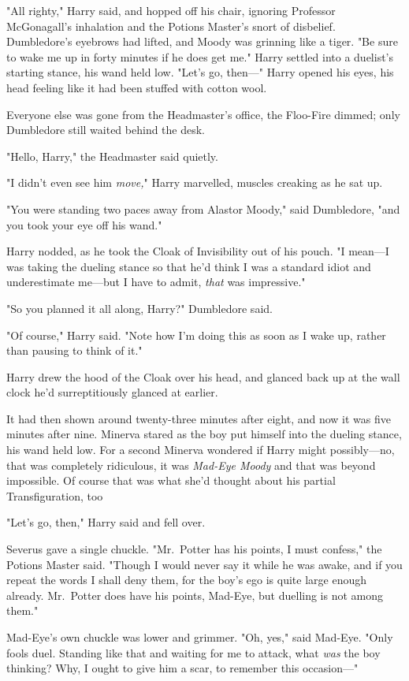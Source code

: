 "All righty," Harry said, and hopped off his chair, ignoring Professor
McGonagall's inhalation and the Potions Master's snort of disbelief.
Dumbledore's eyebrows had lifted, and Moody was grinning like a tiger. "Be sure
to wake me up in forty minutes if he does get me." Harry settled into a
duelist's starting stance, his wand held low. "Let's go, then—"
\sbreak
Harry opened his eyes, his head feeling like it had been stuffed with cotton
wool.

Everyone else was gone from the Headmaster's office, the Floo-Fire dimmed; only
Dumbledore still waited behind the desk.

"Hello, Harry," the Headmaster said quietly.

"I didn't even see him \emph{move,}" Harry marvelled, muscles creaking as he
sat up.

"You were standing two paces away from Alastor Moody," said Dumbledore, "and
you took your eye off his wand."

Harry nodded, as he took the Cloak of Invisibility out of his pouch. "I
mean—I was taking the dueling stance so that he'd think I was a standard
idiot and underestimate me—but I have to admit, \emph{that} was impressive."

"So you planned it all along, Harry?" Dumbledore said.

"Of course," Harry said. "Note how I'm doing this as soon as I wake up, rather
than pausing to think of it."

Harry drew the hood of the Cloak over his head, and glanced back up at the wall
clock he'd surreptitiously glanced at earlier.

It had then shown around twenty-three minutes after eight, and now it was five
minutes after nine.
\sbreak
Minerva stared as the boy put himself into the dueling stance, his wand held
low. For a second Minerva wondered if Harry might possibly—no, that was
completely ridiculous, it was \emph{Mad-Eye Moody} and that was beyond
impossible. Of course that was what she'd thought about his partial
Transfiguration, too{\el}

"Let's go, then," Harry said and fell over.

Severus gave a single chuckle. "Mr.~Potter has his points, I must confess," the
Potions Master said. "Though I would never say it while he was awake, and if
you repeat the words I shall deny them, for the boy's ego is quite large enough
already. Mr.~Potter does have his points, Mad-Eye, but duelling is not among
them."

Mad-Eye's own chuckle was lower and grimmer. "Oh, yes," said Mad-Eye. "Only
fools duel. Standing like that and waiting for me to attack, what \emph{was}
the boy thinking? Why, I ought to give him a scar, to remember this occasion—"

